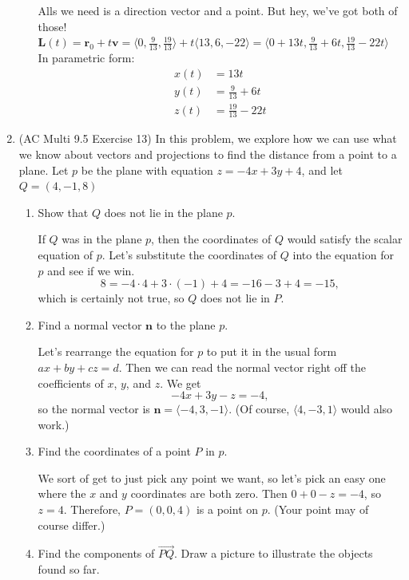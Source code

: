 \documentclass[10pt]{article}
\newcommand{\vv}{\mathbf{v}}
\newcommand{\vn}{\mathbf{n}}
\newenvironment{red}{\color{red}}{\ignorespacesafterend}
\begin{document}
\begin{enumerate}[leftmargin=0pt]
\begin{enumerate}
	\begin{red}
		Alls we need is a direction vector and a point. But hey, we've got both of those! \\
		$\mathbf{L}(t) = \mathbf{r}_0 + t \vv 
		= \langle 0, \tfrac{9}{13}, \tfrac{19}{13} \rangle 
		+ t \langle 13, 6, -22 \rangle
		= \langle 0 + 13t, \tfrac{9}{13} + 6t, \tfrac{19}{13} - 22t \rangle$ \\
		In parametric form:
		\begin{align*}
			x(t) &= 13t\\
			y(t) &= \tfrac{9}{13} + 6t\\
			z(t) &= \tfrac{19}{13} - 22t
		\end{align*}
	\end{red}
\end{enumerate}

\item  (AC Multi 9.5 Exercise 13) In this problem, we explore how we can use what we know about vectors and projections to find the distance from a point to a plane. Let $p$ be the plane with equation $z=-4x+3y+4$, and let $Q = (4, -1, 8)$
\begin{enumerate}
    \item Show that $Q$ does not lie in the plane $p$.
    
    \begin{red}
    If $Q$ was in the plane $p$, then the coordinates of $Q$ would satisfy the scalar equation of $p$. Let's substitute the coordinates of $Q$ into the equation for $p$ and see if we win.
    \[8 = -4\cdot 4 + 3\cdot (-1) + 4 = -16 - 3 + 4 = -15,\]
    which is certainly not true, so $Q$ does not lie in $P$.
    \end{red}
    \item Find a normal vector $\vn$ to the plane $p$.
    
    \begin{red}
    Let's rearrange the equation for $p$ to put it in the usual form $ax + by + cz = d$. Then we can read the normal vector right off the coefficients of $x$, $y$, and $z$. We get
    \[-4x + 3y - z = -4,\] so the normal vector is $\vn = \langle -4, 3, -1\rangle$. (Of course, $\langle 4, -3, 1\rangle$ would also work.)
    \end{red}
    \item Find the coordinates of a point $P$ in $p$.
    
    \begin{red}
    We sort of get to just pick any point we want, so let's pick an easy one where the $x$ and $y$ coordinates are both zero. Then $0 + 0 - z = -4$, so $z=4$. Therefore, $P = (0, 0, 4)$ is a point on $p$. (Your point may of course differ.)
    \end{red}
    \item Find the components of $\overrightarrow{PQ}$. Draw a picture to illustrate the objects found so far.
    

\end{enumerate}
\end{enumerate}
\end{document}

